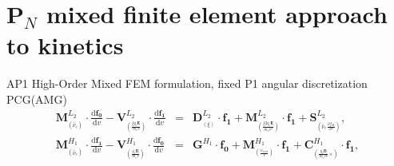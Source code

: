 \documentclass[8pt, compress]{beamer}
\newcommand{\pdv}[2]{\frac{\partial{#1}}{\partial{#2}}}
\newcommand{\vect}[1]{\boldsymbol{#1}}
\newcommand{\matr}[1]{\mathbf{#1}}
\newcommand{\dI}{\text{d}}
\newcommand{\odv}[2]{\frac{\dI #1}{\dI #2}}
\newcommand{\ddv}[2]{\odv{#1}{#2}}
\newcommand{\nue}{\nu_{e}}
\newcommand{\nuscat}{\nu_{scat}}
\newcommand{\vmag}{v}
\newcommand{\E}{\vect{E}}
\newcommand{\B}{\vect{B}}
\newcommand{\qe}{q_e}
\newcommand{\me}{m_e}
\newcommand{\fM}{f_M}
\newcommand{\vfzero}{\vect{f_0}}
\newcommand{\fone}{{\vect{f_1}}}
\newcommand{\colorimportant}[1]{ {\color{purple} #1} }
\begin{document}
\section{P$_N$ mixed finite element approach to kinetics}
\newcommand{\edf}{\colorimportant{f}}
\renewcommand{\fs}{0.4}
\begin{frame}
\begin{center}
{\Large AP1 High-Order Mixed FEM formulation, fixed P1 angular discretization PCG(AMG)}
\begin{eqnarray}
  \matr{M}^{L_2}_{_{(\tilde{\nue})}}\cdot\ddv{\vfzero}{\vmag} 
  - \matr{V}^{L_2}_{_{(\frac{\xi\qe\E}{\me\vmag})}}\cdot\ddv{\fone}{\vmag}
  &=&
  \matr{D}^{L_2}_{_{(\xi)}}\cdot\fone 
  + \matr{M}^{L_2}_{_{(\frac{\xi2\qe\E}{\me\vmag^2})}}\cdot\fone
  + \vect{S}^{L_2}_{_{(\tilde{\nue}\pdv{\fM}{\vmag})}}, 
  \nonumber\label{eq:FEMAP1f0}
  \\
  \matr{M}^{H_1}_{_{(\tilde{\nue})}}\cdot\ddv{\fone}{\vmag}
  - \matr{V}^{H_1}_{_{(\frac{\qe\E}{\me\vmag})}}\cdot\ddv{\vfzero}{\vmag}
   &=& 
  \matr{G}^{H_1}\cdot\vfzero 
  + \matr{M}^{H_1}_{_{(\frac{\nuscat}{\vmag})}}\cdot\fone 
  + \matr{C}^{H_1}_{_{(\frac{\qe\B}{\me c \vmag}\vect{\times})}}\cdot\fone
  ,
  \nonumber \label{eq:FEMAP1f1}
\end{eqnarray}


\end{center}
\end{frame}
\end{document}
